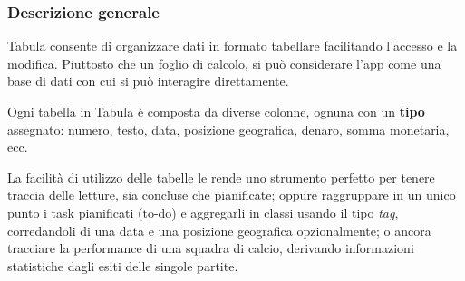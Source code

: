 \documentclass{beamer}
\begin{document}
\begin{frame}
  \frametitle{Descrizione generale}

  Tabula consente di organizzare dati in formato tabellare facilitando l'accesso e la modifica. Piuttosto che un foglio di calcolo, si può considerare l'app come una base di dati con cui si può interagire direttamente.

  \vspace{10pt}

  Ogni tabella in Tabula è composta da diverse colonne, ognuna con un \textbf{tipo} assegnato: numero, testo, data, posizione geografica, denaro, somma monetaria, ecc.

  \vspace{10pt}

  La facilità di utilizzo delle tabelle le rende uno strumento perfetto per tenere traccia delle letture, sia concluse che pianificate; oppure raggruppare in un unico punto i task pianificati (to-do) e aggregarli in classi usando il tipo \textit{tag}, corredandoli di una data e una posizione geografica opzionalmente; o ancora tracciare la performance di una squadra di calcio, derivando informazioni statistiche dagli esiti delle singole partite.

\end{frame}
\end{document}
